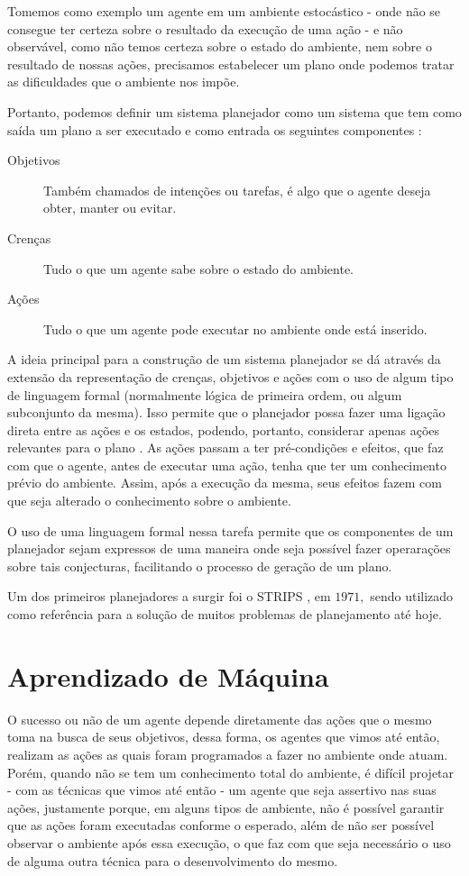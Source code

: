 Tomemos como exemplo um agente em um ambiente estocástico - onde não se consegue
ter certeza sobre o resultado da execução de uma ação - e não observável, como
não temos certeza sobre o estado do ambiente, nem sobre o resultado de nossas
ações, precisamos estabelecer um plano onde podemos tratar as dificuldades que o
ambiente nos impõe.

Portanto, podemos definir um sistema planejador como um sistema que tem como
saída um plano a ser executado e como entrada os seguintes componentes
\cite{Woolridge:2001:IMS:559667}:

\begin{description} \item [Objetivos] Também chamados de intenções ou tarefas, é
algo que o agente deseja obter, manter ou evitar.  \item [Crenças] Tudo o que um
agente sabe sobre o estado do ambiente.  \item [Ações] Tudo o que um agente pode
executar no ambiente onde está inserido.
\end{description}
A ideia principal para a construção de um sistema planejador se dá através da
extensão da representação de crenças, objetivos e ações com o uso de algum tipo
de linguagem formal (normalmente lógica de primeira ordem, ou algum subconjunto
da mesma). Isso permite que o planejador possa fazer uma ligação direta entre as
ações e os estados, podendo, portanto, considerar apenas ações relevantes para o
plano \cite{Russell:1995:AIM:193191}. As ações passam a ter pré-condições e
efeitos, que faz com que o agente, antes de executar uma ação, tenha que ter um
conhecimento prévio do ambiente. Assim, após a execução da mesma, seus efeitos
fazem com que seja alterado o conhecimento sobre o ambiente.

O uso de uma linguagem formal nessa tarefa permite que os componentes de um
planejador sejam expressos de uma maneira onde seja possível fazer operarações
sobre tais conjecturas, facilitando o processo de geração de um plano.

Um dos primeiros planejadores a surgir foi o STRIPS \cite{STRIPSNEWAPPROACH}, em
$1971,$ sendo utilizado como referência para a solução de muitos problemas de
planejamento até hoje.

\section{Aprendizado de Máquina}

O sucesso ou não de um agente depende diretamente das ações que o mesmo toma na
busca de seus objetivos, dessa forma, os agentes que vimos até então, realizam
as ações as quais foram programados a fazer no ambiente onde atuam. Porém,
quando não se tem um conhecimento total do ambiente, é difícil projetar - com as
técnicas que vimos até então - um agente que seja assertivo nas suas ações,
justamente porque, em alguns tipos de ambiente, não é possível garantir que as
ações foram executadas conforme o esperado, além de não ser possível observar
o ambiente após essa execução, o que faz com que seja necessário o uso de alguma
outra técnica para o desenvolvimento do mesmo.

